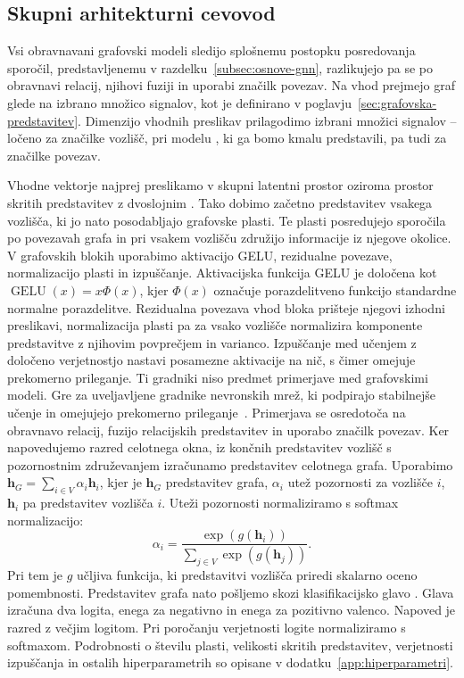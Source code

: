 

\subsection{Skupni arhitekturni cevovod}
\label{subsec:skupni-deli-grafovske-arhitekture}

Vsi obravnavani grafovski modeli sledijo splošnemu postopku posredovanja sporočil, predstavljenemu v razdelku~\ref{subsec:osnove-gnn}, razlikujejo pa se po obravnavi relacij, njihovi fuziji in uporabi značilk povezav.
Na vhod prejmejo graf glede na izbrano množico signalov, kot je definirano v poglavju~\ref{sec:grafovska-predstavitev}.
Dimenzijo vhodnih preslikav prilagodimo izbrani množici signalov -- ločeno za značilke vozlišč, pri modelu , ki ga bomo kmalu predstavili, pa tudi za značilke povezav.

Vhodne vektorje najprej preslikamo v skupni latentni prostor oziroma prostor skritih predstavitev z dvoslojnim .
Tako dobimo začetno predstavitev vsakega vozlišča, ki jo nato posodabljajo grafovske plasti.
Te plasti posredujejo sporočila po povezavah grafa in pri vsakem vozlišču združijo informacije iz njegove okolice.
V grafovskih blokih uporabimo aktivacijo GELU, rezidualne povezave, normalizacijo plasti in izpuščanje.
Aktivacijska funkcija GELU je določena kot $\operatorname{GELU}(x)=x\Phi(x)$, kjer  $\Phi(x)$ označuje porazdelitveno funkcijo standardne normalne porazdelitve.
Rezidualna povezava vhod bloka prišteje njegovi izhodni preslikavi, normalizacija plasti pa za vsako vozlišče normalizira komponente predstavitve z njihovim povprečjem in varianco.
Izpuščanje med učenjem z določeno verjetnostjo nastavi posamezne aktivacije na nič, s čimer omejuje prekomerno prileganje.
Ti gradniki niso predmet primerjave med grafovskimi modeli.
Gre za uveljavljene gradnike nevronskih mrež, ki podpirajo stabilnejše učenje in omejujejo prekomerno prileganje~\cite{hendrycks2016gelu,he2016deep,ba2016layer,srivastava2014dropout}.
Primerjava se osredotoča na obravnavo relacij, fuzijo relacijskih predstavitev in uporabo značilk povezav.
Ker napovedujemo razred celotnega okna, iz končnih predstavitev vozlišč s pozornostnim združevanjem izračunamo predstavitev celotnega grafa.
Uporabimo $\mathbf{h}_G = \sum_{i \in V} \alpha_i \mathbf{h}_i$, kjer je $\mathbf{h}_G$ predstavitev grafa, $\alpha_i$ utež pozornosti za vozlišče $i$, $\mathbf{h}_i$ pa predstavitev vozlišča $i$.
Uteži pozornosti normaliziramo s softmax normalizacijo:
\begin{equation}
    \alpha_i = \frac{\exp(g(\mathbf{h}_i))}{\sum_{j \in V} \exp(g(\mathbf{h}_j))}.
\end{equation}
Pri tem je $g$ učljiva funkcija, ki predstavitvi vozlišča priredi skalarno oceno pomembnosti.
Predstavitev grafa nato pošljemo skozi klasifikacijsko glavo .
Glava izračuna dva logita, enega za negativno in enega za pozitivno valenco.
Napoved je razred z večjim logitom.
Pri poročanju verjetnosti logite normaliziramo s softmaxom.
Podrobnosti o številu plasti, velikosti skritih predstavitev, verjetnosti izpuščanja in ostalih hiperparametrih so opisane v dodatku~\ref{app:hiperparametri}.

